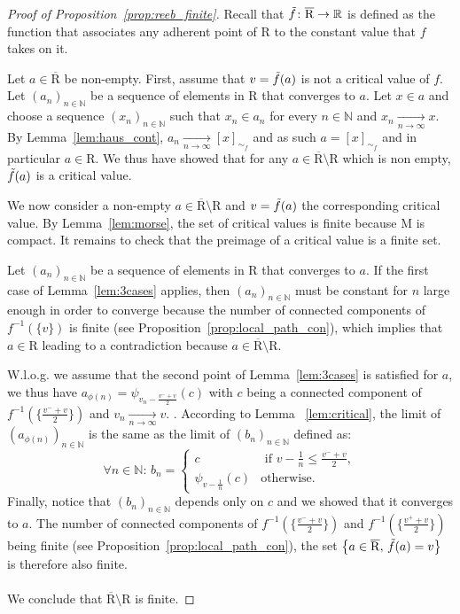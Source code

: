 \documentclass[pdflatex,sn-mathphys-ay]{sn-jnl}%
\newcommand{\reeb}{\mathrm{R}}
\newcommand{\man}{\mathrm{M}}
\newcommand{\converge}{\underset{n\rightarrow\infty}{\longrightarrow}}
\newcommand{\R}{\mathbb{R}}
\newcommand{\N}{\mathbb{N}}
\newcommand{\preim}[2]{#1^{-1}(#2)}
\theoremstyle{thmstyleone}%
\begin{document}
\begin{appendices}
\begin{proof}[Proof of Proposition~\ref{prop:reeb_finite}]
Recall that $\Tilde{f}\colon \overline{\reeb}\rightarrow\R$ is defined as the function that associates any adherent point of $\reeb$ to the constant value that $f$ takes on it. 


 Let $a\in\overline{\reeb}$ be non-empty. First, assume that $v=\Tilde{f}(a)$ is not a critical value of $f$. Let $(a_n)_{n\in\N}$ be a sequence of elements in $\reeb$ that converges to $a$. Let $x\in a$ and choose a sequence $(x_n)_{n\in\N}$ such that $x_n\in a_n$ for every $n\in\N$ and $x_n\converge x$. By Lemma~\ref{lem:haus_cont}, $a_n\converge[x]_{\sim_f}$ and as such $a=[x]_{\sim_f}$ and in particular  $a\in\reeb$. We thus have showed that for any  $a\in\overline{\reeb}\setminus\reeb$ which is non empty, $\Tilde{f}(a)$ is a critical value.

We now consider a non-empty $a\in\overline{\reeb}\setminus\reeb$ and $v=\Tilde{f}(a)$ the corresponding critical value. By Lemma~\ref{lem:morse}, the set of critical values is finite because $\man$ is compact. It remains to check that the  preimage of a critical value is a finite set. 
 
Let $(a_n)_{n\in\N}$ be a sequence of elements in $\reeb$ that converges to $a$. If the first case of Lemma~\ref{lem:3cases} applies, then $(a_n)_{n\in\N}$ must be constant for $n$ large enough in order to converge because the number of connected components of $\preim{f}{\{v\}}$ is finite (see Proposition~\ref{prop:local_path_con}), which implies that $a\in\reeb$ leading to a contradiction because $a\in\overline{\reeb}\setminus\reeb$.


W.l.o.g. we assume that the second point of Lemma~\ref{lem:3cases} is satisfied for $a$, we thus have $a_{\phi(n)}=\psi_{v_n-\frac{v^-+v}{2}}(c)$ with $c$ being a connected component of $\preim{f}{\{\frac{v^-+v}{2}\}}$ and $v_n\converge v$. . According to Lemma ~\ref{lem:critical}, the limit of $(a_{\phi(n)})_{n\in\N}$ is the same as the limit of $(b_n)_{n\in\N}$ defined as:
$$\forall n\in\N:\,b_n=\begin{cases}
    c&\text{ if } v-\frac{1}{n}\leq\frac{v^-+v}{2},\\
    \psi_{v-\frac{1}{n}}(c)&\text{otherwise}.
\end{cases}$$
Finally, notice that $(b_n)_{n\in\N}$ depends only on $c$ and we showed that it converges to $a$. The number of connected components of $\preim{f}{\{\frac{v^-+v}{2}\}}$ and $\preim{f}{\{\frac{v^++v}{2}\}}$ being finite (see Proposition~\ref{prop:local_path_con}), the set $\left\{a\in\overline{\reeb},\,\Tilde{f}(a)=v\right\}$ is therefore also finite.\\\\
We conclude that $\overline{\reeb}\setminus\reeb$ is finite.
\end{proof}

\end{appendices}
\end{document}
